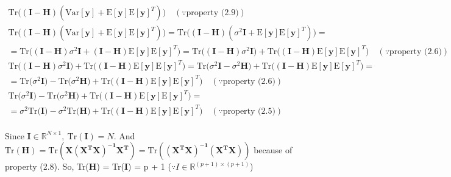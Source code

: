 \documentclass{homework}
\begin{document}
\begin{equation*}
\begin{gathered}
        \text{Tr}\big (\mathbf{(I-H)}\left(\text{Var}[\mathbf{y}] + \text{E}[\mathbf{y}]\text{E}[\mathbf{y}]^T\right)\big) 
        \quad (\because \text{property (2.9)}) \\[4pt]
        \text{Tr}\big (\mathbf{(I-H)}\left(\text{Var}[\mathbf{y}] + \text{E}[\mathbf{y}]\text{E}[\mathbf{y}]^T\right)\big) = 
        \text{Tr}\big (\mathbf{(I-H)}\left(\sigma^2\mathbf{I} + \text{E}[\mathbf{y}]\text{E}[\mathbf{y}]^T\right)\big) = \\[4pt]
        = \text{Tr}\big(\mathbf{(I-H)}\sigma^2\mathbf{I} +  \mathbf{(I-H)}\text{E}[\mathbf{y}]\text{E}[\mathbf{y}]^T\big) = 
        \text{Tr}\big(\mathbf{(I-H)}\sigma^2\mathbf{I}\big) + \text{Tr}\big(  \mathbf{(I-H)}\text{E}[\mathbf{y}]\text{E}[\mathbf{y}]^T\big)
        \quad (\because \text{property (2.6)}) \\[4pt]
        \text{Tr}\big(\mathbf{(I-H)}\sigma^2\mathbf{I}\big) + \text{Tr}\big(  \mathbf{(I-H)}\text{E}[\mathbf{y}]\text{E}[\mathbf{y}]^T\big) = 
        \text{Tr}\big(\sigma^2\mathbf{I} - \sigma^2\mathbf{H}\big) + \text{Tr}\big( \mathbf{(I-H)}\text{E}[\mathbf{y}]\text{E}[\mathbf{y}]^T\big) = \\[4pt]
        = \text{Tr}\big(\sigma^2\mathbf{I}\big) - \text{Tr}\big(\sigma^2\mathbf{H}\big) + \text{Tr}\big( \mathbf{(I-H)}\text{E}[\mathbf{y}]\text{E}[\mathbf{y}]^T\big)
        \quad (\because \text{property (2.6)}) \\[4pt]
        \text{Tr}\big(\sigma^2\mathbf{I}\big) - \text{Tr}\big(\sigma^2\mathbf{H}\big) + \text{Tr}\big( \mathbf{(I-H)}\text{E}[\mathbf{y}]\text{E}[\mathbf{y}]^T\big) = \\[4pt] 
        = \sigma^2\text{Tr}\big(\mathbf{I}\big) - \sigma^2\text{Tr}\big(\mathbf{H}\big) + \text{Tr}\big( \mathbf{(I-H)}\text{E}[\mathbf{y}]\text{E}[\mathbf{y}]^T\big)
        \quad (\because \text{property (2.5)}) \\[4pt]
    \end{gathered}
    \end{equation*}
    
    Since $\mathbf{I} \in \mathbb{R}^{N\times 1},\  \text{Tr}(\mathbf{I}) = N$. And $\text{Tr}(\mathbf{H}) = \text{Tr}(\mathbf{X(X^TX)^{-1}X^T}) = \text{Tr}(\mathbf{(X^TX)^{-1}(X^TX)})$ because of property (2.8). So, Tr(\textbf{H}) = Tr(\textbf{I}) = p + 1 ($\because I \in \mathbb{R}^{(p+1)\times(p+1)}$)
    
\end{document}

